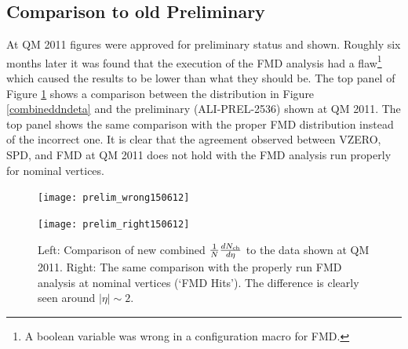 \documentclass[11pt]{article}
\newcommand{\mult}[1][]{\ensuremath N_{\text{ch}#1}}
\newcommand{\dndeta}[1][]{{\ensuremath%
    \ifx|#1|\else\left.\fi%
    \frac{1}{N}\frac{d\mult{}}{d\eta}%
    \ifx|#1|\else\right|_{#1}\fi%
}}
\begin{document}
\subsection{Comparison to old Preliminary}
At QM 2011 figures were approved for preliminary status and
shown. Roughly six months later it was found that the execution of the
FMD analysis had a flaw\footnote{A boolean variable was wrong in a
  configuration macro for FMD.} which caused the results to be lower than what they
should be. The top panel of Figure \ref{prelimcomparison} shows a
comparison between the distribution in Figure \ref{combineddndeta} and
the preliminary (ALI-PREL-2536) shown at QM 2011. The top panel shows the same
comparison with the proper FMD distribution instead of the incorrect
one. It is clear that the agreement observed between VZERO, SPD,
and FMD at QM 2011 does not hold with the FMD analysis run properly
for nominal vertices. 
\begin{figure}
  \centering
  \begin{minipage}{0.5\linewidth}
  \centering
  \texttt{[image: prelim\_wrong150612]}
  \end{minipage}%
  \begin{minipage}{0.5\linewidth}
  \centering
  \texttt{[image: prelim\_right150612]}
\end{minipage}%
  \caption{Left: Comparison of new combined $\dndeta$ to the data
    shown at QM 2011. Right: The same comparison with the properly run
  FMD analysis at nominal vertices (`FMD Hits'). The difference is
  clearly seen around $|\eta| \sim 2$.}
  \label{prelimcomparison}
\end{figure} 
\end{document}
